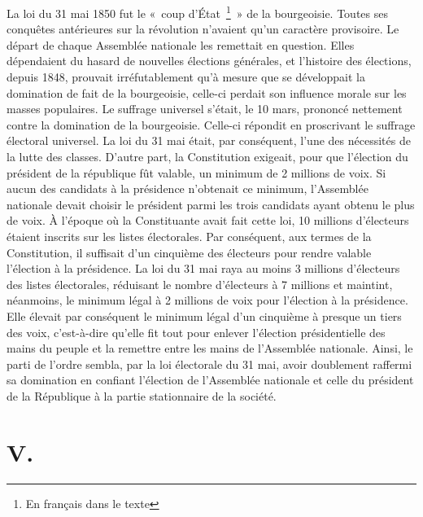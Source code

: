 \documentclass[french,twoside]{book} %
\newcommand\chapteropen{} %
\newcommand\chapterclose{} %
\begin{document}
La loi du 31 mai 1850 fut le « coup d’État \footnote{En français dans le texte} » de la bourgeoisie. Toutes ses conquêtes antérieures sur la révolution n’avaient qu’un caractère provisoire. Le départ de chaque Assemblée nationale les remettait en question. Elles dépendaient du hasard de nouvelles élections générales, et l’histoire des élections, depuis 1848, prouvait irréfutablement qu’à mesure que se développait la domination de fait de la bourgeoisie, celle-ci perdait son influence morale sur les masses populaires. Le suffrage universel s’était, le 10 mars, prononcé nettement contre la domination de la bourgeoisie. Celle-ci répondit en proscrivant le suffrage électoral universel. La loi du 31 mai était, par conséquent, l’une des nécessités de la lutte des classes. D’autre part, la Constitution exigeait, pour que l’élection du président de la république fût valable, un minimum de 2 millions de voix. Si aucun des candidats à la présidence n’obtenait ce minimum, l’Assemblée nationale devait choisir le président parmi les trois candidats ayant obtenu le plus de voix. À l’époque où la Constituante avait fait cette loi, 10 millions d’électeurs étaient inscrits sur les listes électorales. Par conséquent, aux termes de la Constitution, il suffisait d’un cinquième des électeurs pour rendre valable l’élection à la présidence. La loi du 31 mai raya au moins 3 millions d’électeurs des listes électorales, réduisant le nombre d’électeurs à 7 millions et maintint, néanmoins, le minimum légal à 2 millions de voix pour l’élection à la présidence. Elle élevait par conséquent le minimum légal d’un cinquième à presque un tiers des voix, c’est-à-dire qu’elle fit tout pour enlever l’élection présidentielle des mains du peuple et la remettre entre les mains de l’Assemblée nationale. Ainsi, le parti de l’ordre sembla, par la loi électorale du 31 mai, avoir doublement raffermi sa domination en confiant l’élection de l’Assemblée nationale et celle du président de la République à la partie stationnaire de la société.
\chapterclose


\chapteropen
\chapter[{V.}]{V.}\renewcommand{\leftmark}{V.}
\end{document}
